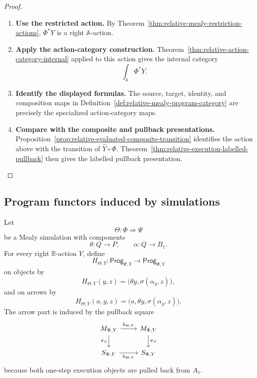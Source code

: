 \begin{proof}
\leavevmode
\begin{enumerate}
\item \textbf{Use the restricted action.}
By Theorem~\ref{thm:relative-mealy-restriction-actions},
\(\Phi^\ast Y\) is a right \(\mathbb A\)-action.

\item \textbf{Apply the action-category construction.}
Theorem~\ref{thm:relative-action-category-internal} applied to this action
gives the internal category
\[
\int_{\mathbb A}\Phi^\ast Y.
\]

\item \textbf{Identify the displayed formulas.}
The source, target, identity, and composition maps in
Definition~\ref{def:relative-mealy-program-category} are precisely the
specialized action-category maps.

\item \textbf{Compare with the composite and pullback presentations.}
Proposition~\ref{prop:relative-evaluated-composite-transition} identifies
the action above with the transition of \(\widehat Y\circ\Phi\).
Theorem~\ref{thm:relative-execution-labelled-pullback} then gives the
labelled pullback presentation.
\end{enumerate}
\end{proof}

\subsection{Program functors induced by simulations}
\label{subsec:relative-program-functors-simulations}

\begin{definition}
\label{def:relative-program-functor-simulation}
Let
\[
\Theta:\Phi\Rightarrow\Psi
\]
be a Mealy simulation with components
\[
\theta:Q\to P,
\qquad
\alpha:Q\to B_1.
\]
For every right \(\mathbb B\)-action \(Y\), define
\[
H_{\Theta,Y}:
\mathsf{Prog}_{\Psi,Y}
\to
\mathsf{Prog}_{\Phi,Y}
\]
on objects by
\[
H_{\Theta,Y}(y,z)
=
\bigl(\theta y,\sigma(\alpha_y,z)\bigr),
\]
and on arrows by
\[
H_{\Theta,Y}(a,y,z)
=
\bigl(a,\theta y,\sigma(\alpha_y,z)\bigr).
\]
The arrow part is induced by the pullback square
\[
\begin{tikzcd}
M_{\Psi,Y}
\arrow[r,"k_{\Theta,Y}"]
\arrow[d,"\pi_S"']
&
M_{\Phi,Y}
\arrow[d,"\pi_S"]
\\
S_{\Psi,Y}
\arrow[r,"h_{\Theta,Y}"']
&
S_{\Phi,Y}
\end{tikzcd}
\]
because both one-step execution objects are pulled back from \(A_1\).
\end{definition}

